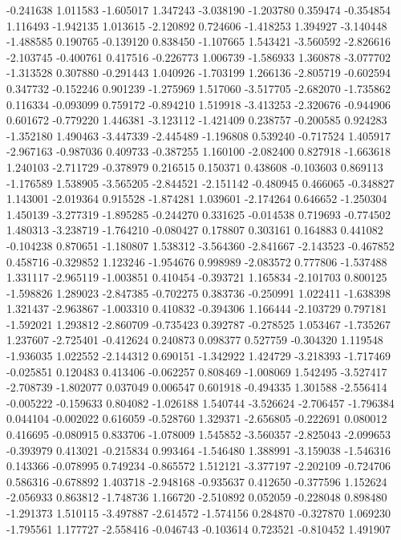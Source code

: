 -0.241638
1.011583
-1.605017
1.347243
-3.038190
-1.203780
0.359474
-0.354854
1.116493
-1.942135
1.013615
-2.120892
0.724606
-1.418253
1.394927
-3.140448
-1.488585
0.190765
-0.139120
0.838450
-1.107665
1.543421
-3.560592
-2.826616
-2.103745
-0.400761
0.417516
-0.226773
1.006739
-1.586933
1.360878
-3.077702
-1.313528
0.307880
-0.291443
1.040926
-1.703199
1.266136
-2.805719
-0.602594
0.347732
-0.152246
0.901239
-1.275969
1.517060
-3.517705
-2.682070
-1.735862
0.116334
-0.093099
0.759172
-0.894210
1.519918
-3.413253
-2.320676
-0.944906
0.601672
-0.779220
1.446381
-3.123112
-1.421409
0.238757
-0.200585
0.924283
-1.352180
1.490463
-3.447339
-2.445489
-1.196808
0.539240
-0.717524
1.405917
-2.967163
-0.987036
0.409733
-0.387255
1.160100
-2.082400
0.827918
-1.663618
1.240103
-2.711729
-0.378979
0.216515
0.150371
0.438608
-0.103603
0.869113
-1.176589
1.538905
-3.565205
-2.844521
-2.151142
-0.480945
0.466065
-0.348827
1.143001
-2.019364
0.915528
-1.874281
1.039601
-2.174264
0.646652
-1.250304
1.450139
-3.277319
-1.895285
-0.244270
0.331625
-0.014538
0.719693
-0.774502
1.480313
-3.238719
-1.764210
-0.080427
0.178807
0.303161
0.164883
0.441082
-0.104238
0.870651
-1.180807
1.538312
-3.564360
-2.841667
-2.143523
-0.467852
0.458716
-0.329852
1.123246
-1.954676
0.998989
-2.083572
0.777806
-1.537488
1.331117
-2.965119
-1.003851
0.410454
-0.393721
1.165834
-2.101703
0.800125
-1.598826
1.289023
-2.847385
-0.702275
0.383736
-0.250991
1.022411
-1.638398
1.321437
-2.963867
-1.003310
0.410832
-0.394306
1.166444
-2.103729
0.797181
-1.592021
1.293812
-2.860709
-0.735423
0.392787
-0.278525
1.053467
-1.735267
1.237607
-2.725401
-0.412624
0.240873
0.098377
0.527759
-0.304320
1.119548
-1.936035
1.022552
-2.144312
0.690151
-1.342922
1.424729
-3.218393
-1.717469
-0.025851
0.120483
0.413406
-0.062257
0.808469
-1.008069
1.542495
-3.527417
-2.708739
-1.802077
0.037049
0.006547
0.601918
-0.494335
1.301588
-2.556414
-0.005222
-0.159633
0.804082
-1.026188
1.540744
-3.526624
-2.706457
-1.796384
0.044104
-0.002022
0.616059
-0.528760
1.329371
-2.656805
-0.222691
0.080012
0.416695
-0.080915
0.833706
-1.078009
1.545852
-3.560357
-2.825043
-2.099653
-0.393979
0.413021
-0.215834
0.993464
-1.546480
1.388991
-3.159038
-1.546316
0.143366
-0.078995
0.749234
-0.865572
1.512121
-3.377197
-2.202109
-0.724706
0.586316
-0.678892
1.403718
-2.948168
-0.935637
0.412650
-0.377596
1.152624
-2.056933
0.863812
-1.748736
1.166720
-2.510892
0.052059
-0.228048
0.898480
-1.291373
1.510115
-3.497887
-2.614572
-1.574156
0.284870
-0.327870
1.069230
-1.795561
1.177727
-2.558416
-0.046743
-0.103614
0.723521
-0.810452
1.491907
